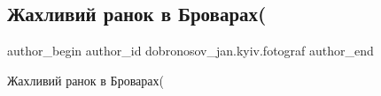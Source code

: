  
 
 
 
 

\subsection{Жахливий ранок в Броварах(}
\label{sec:18_01_2023.fb.dobronosov_jan.kyiv.fotograf.1.zhakhlivii_ranok_v_b}

\ifcmt
 author_begin
   author_id dobronosov_jan.kyiv.fotograf
 author_end
\fi

Жахливий ранок в Броварах(
